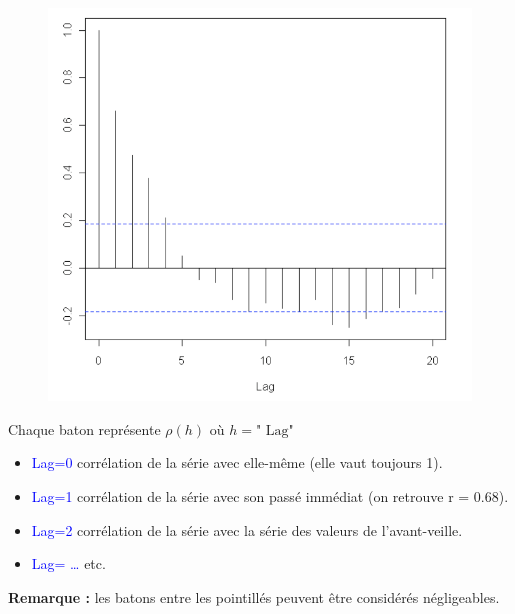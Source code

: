 \begin{itemize}
\begin{figure}[H]\begin{center}\includegraphics[scale=0.5]{ilu/ccm27.png}\end{center}\end{figure}
Chaque baton représente $\rho(h)$ où $h=\textrm{" Lag"}$
\begin{itemize}
\item \textcolor{blue}{Lag=0} corrélation de la série avec elle-même (elle vaut toujours 1).
\item \textcolor{blue}{Lag=1} corrélation de la série avec son passé immédiat (on retrouve r = 0.68).
\item \textcolor{blue}{Lag=2} corrélation de la série avec la série des valeurs de l'avant-veille.
\item \textcolor{blue}{Lag= \dots} etc.
\end{itemize}
\textbf{Remarque : } les batons entre les pointillés peuvent être considérés négligeables.
\end{itemize}
